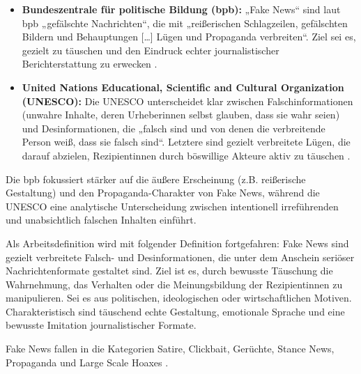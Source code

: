 \begin{itemize}
    \item \textbf{Bundeszentrale für politische Bildung (bpb):}
    „Fake News“ sind laut bpb „gefälschte Nachrichten“, die mit „reißerischen Schlagzeilen, gefälschten Bildern und Behauptungen […] Lügen und Propaganda verbreiten“. 
    Ziel sei es, gezielt zu täuschen und den Eindruck echter journalistischer Berichterstattung zu erwecken \cite{bpb2022fakenews}.

    \item \textbf{United Nations Educational, Scientific and Cultural Organization (UNESCO):}
    Die UNESCO unterscheidet klar zwischen Falschinformationen (unwahre Inhalte, deren Urheberinnen selbst glauben, dass sie wahr seien) und Desinformationen, 
    die „falsch sind und von denen die verbreitende Person weiß, dass sie falsch sind“. Letztere sind gezielt verbreitete Lügen, die darauf abzielen, 
    Rezipientinnen durch böswillige Akteure aktiv zu täuschen \cite{unesco2022fakenews}.
\end{itemize}

Die bpb fokussiert stärker auf die äußere Erscheinung (z.B. reißerische Gestaltung) und den Propaganda-Charakter von Fake News, 
während die UNESCO eine analytische Unterscheidung zwischen intentionell irreführenden und unabsichtlich falschen Inhalten einführt.

Als Arbeitsdefinition wird mit folgender Definition fortgefahren:
Fake News sind gezielt verbreitete Falsch- und Desinformationen, die unter dem Anschein seriöser Nachrichtenformate gestaltet sind. 
Ziel ist es, durch bewusste Täuschung die Wahrnehmung, das Verhalten oder die Meinungsbildung der Rezipientinnen zu manipulieren. Sei es aus politischen, 
ideologischen oder wirtschaftlichen Motiven. Charakteristisch sind täuschend echte Gestaltung, emotionale Sprache und eine bewusste Imitation journalistischer Formate.

Fake News fallen in die Kategorien Satire, Clickbait, Gerüchte, Stance News, Propaganda und Large Scale Hoaxes \cite{Sharma:2024}.

